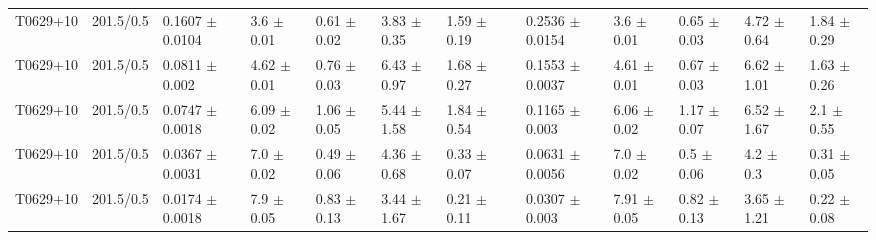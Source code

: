\documentclass[preprint]{emulateapj}
\begin{document}
\begin{table}
\begin{tabular}{ lllllllclllll  }
T0629+10 & 201.5/0.5 & 0.1607 $\pm$ 0.0104 & 3.6 $\pm$ 0.01 & 0.61 $\pm$ 0.02 & 3.83 $\pm$ 0.35 & 1.59 $\pm$ 0.19 & &  0.2536 $\pm$ 0.0154 & 3.6 $\pm$ 0.01 & 0.65 $\pm$ 0.03 & 4.72 $\pm$ 0.64 & 1.84 $\pm$ 0.29 \\
T0629+10 & 201.5/0.5 & 0.0811 $\pm$ 0.002 & 4.62 $\pm$ 0.01 & 0.76 $\pm$ 0.03 & 6.43 $\pm$ 0.97 & 1.68 $\pm$ 0.27 & &  0.1553 $\pm$ 0.0037 & 4.61 $\pm$ 0.01 & 0.67 $\pm$ 0.03 & 6.62 $\pm$ 1.01 & 1.63 $\pm$ 0.26 \\
T0629+10 & 201.5/0.5 & 0.0747 $\pm$ 0.0018 & 6.09 $\pm$ 0.02 & 1.06 $\pm$ 0.05 & 5.44 $\pm$ 1.58 & 1.84 $\pm$ 0.54 & &  0.1165 $\pm$ 0.003 & 6.06 $\pm$ 0.02 & 1.17 $\pm$ 0.07 & 6.52 $\pm$ 1.67 & 2.1 $\pm$ 0.55 \\
T0629+10 & 201.5/0.5 & 0.0367 $\pm$ 0.0031 & 7.0 $\pm$ 0.02 & 0.49 $\pm$ 0.06 & 4.36 $\pm$ 0.68 & 0.33 $\pm$ 0.07 & &  0.0631 $\pm$ 0.0056 & 7.0 $\pm$ 0.02 & 0.5 $\pm$ 0.06 & 4.2 $\pm$ 0.3 & 0.31 $\pm$ 0.05 \\
T0629+10 & 201.5/0.5 & 0.0174 $\pm$ 0.0018 & 7.9 $\pm$ 0.05 & 0.83 $\pm$ 0.13 & 3.44 $\pm$ 1.67 & 0.21 $\pm$ 0.11 & &  0.0307 $\pm$ 0.003 & 7.91 $\pm$ 0.05 & 0.82 $\pm$ 0.13 & 3.65 $\pm$ 1.21 & 0.22 $\pm$ 0.08 \\



\hline
\end{tabular}
\end{table}
\end{document}
